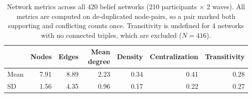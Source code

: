 \begin{table}
\caption{Network metrics across all 420 belief networks (210 participants $\times$ 2 waves). All metrics are computed on de-duplicated node-pairs, so a pair marked both supporting and conflicting counts once. Transitivity is undefined for 4 networks with no connected triples, which are excluded ($N = 416$).}
\label{tab:all_networks_summary}
\begin{tabular}{lrrrrrr}
\toprule
 & Nodes & Edges & Mean degree & Density & Centralization & Transitivity \\
\midrule
Mean & 7.91 & 8.89 & 2.23 & 0.34 & 0.41 & 0.28 \\
SD & 1.56 & 4.35 & 0.96 & 0.17 & 0.22 & 0.27 \\
\bottomrule
\end{tabular}
\end{table}
